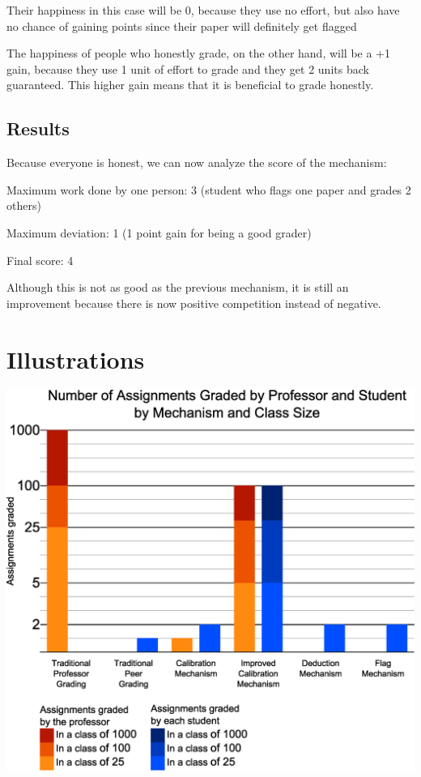 \documentclass[12pt, Arial]{article}
\begin{document}
Their happiness in this case will be 0, because they use no effort, but also have no chance of gaining points since their paper will definitely get flagged

The happiness of people who honestly grade, on the other hand, will be a +1 gain, because they use 1 unit of effort to grade and they get 2 units back guaranteed. This higher gain means that it is beneficial to grade honestly.

\subsection{Results}
Because everyone is honest, we can now analyze the score of the mechanism:

Maximum work done by one person: 3 (student who flags one paper and grades 2 others)

Maximum deviation: 1 (1 point gain for being a good grader)

Final score: 4

Although this is not as good as the previous mechanism, it is still an improvement because there is now positive competition instead of negative.

\section{Illustrations}
{
\noindent
\includegraphics[width=\textwidth]{Chart.eps}
}
\end{document}
